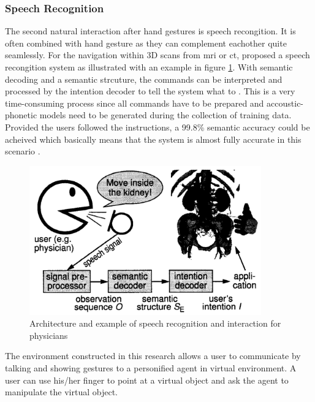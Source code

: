 \subsubsection{Speech Recognition}

\label{SubSubSectionSpeechRecognition}

The second natural interaction after hand gestures is speech recongition. It is often combined with hand gesture as they can complement eachother quite seamlessly. \newline
For the navigation within 3D scans from \gls{mri} or \gls{ct}, \cite{Muller1998} proposed a speech recongition system as illustrated with an example in figure \ref{fig:speechrecognitionmedical}. With semantic decoding and a semantic strcuture, the commands can be interpreted and processed by the intention decoder to tell the system what to \citep{Muller1998}. This is a very time-consuming process since all commands have to be prepared and accoustic-phonetic models need to be generated during the collection of training data. Provided the users followed the instructions, a 99.8\% semantic accuracy could be acheived which basically means that the system is almost fully accurate in this scenario \citep{Muller1998}.
\begin{figure}[h]
	\begin{center}
		\includegraphics[width=10cm]{03_Figures/05_LitReview/Muller1998_SpeechRecognition.png}
		\caption[Architecture and example of speech recognition and interaction for physicians]{Architecture and example of speech recognition and interaction for physicians \citep{Muller1998}}
		\label{fig:speechrecognitionmedical}
	\end{center}
\end{figure}



The environment constructed in this research allows a user to communicate by talking and showing gestures
to a personified agent in virtual environment. A user can use his/her finger to point at a virtual object and ask the agent to manipulate the virtual object.
\cite{Uchino2008}


